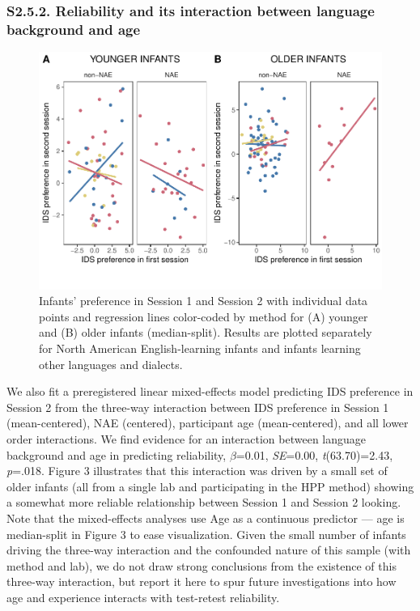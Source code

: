 \documentclass[
  english,
  man, donotrepeattitle,floatsintext]{apa6}
\begin{document}
\hypertarget{s2.5.2.-reliability-and-its-interaction-between-language-background-and-age}{%
\subsubsection{S2.5.2. Reliability and its interaction between language background and age}\label{s2.5.2.-reliability-and-its-interaction-between-language-background-and-age}}

\begin{figure}
\centering
\includegraphics{MB1T_supplement_files/figure-latex/fig3-1.pdf}
\caption{\label{fig:fig3}Infants' preference in Session 1 and Session 2 with individual data points and regression lines color-coded by method for (A) younger and (B) older infants (median-split). Results are plotted separately for North American English-learning infants and infants learning other languages and dialects.}
\end{figure}

We also fit a preregistered linear mixed-effects model predicting IDS preference in Session 2 from the three-way interaction between IDS preference in Session 1 (mean-centered), NAE (centered), participant age (mean-centered), and all lower order interactions.
We find evidence for an interaction between language background and age in predicting reliability, \(\beta\)=0.01, \emph{SE}=0.00, \emph{t}(63.70)=2.43, \emph{p}=.018.
Figure 3 illustrates that this interaction was driven by a small set of older infants (all from a single lab and participating in the HPP method) showing a somewhat more reliable relationship between Session 1 and Session 2 looking.
Note that the mixed-effects analyses use Age as a continuous predictor --- age is median-split in Figure 3 to ease visualization.
Given the small number of infants driving the three-way interaction and the confounded nature of this sample (with method and lab), we do not draw strong conclusions from the existence of this three-way interaction, but report it here to spur future investigations into how age and experience interacts with test-retest reliability.
\end{document}
